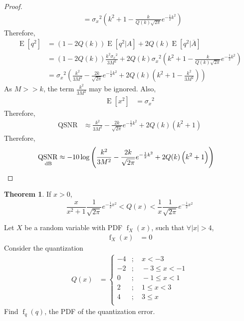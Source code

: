 \documentclass[titlepage, fleqn, a4paper, 12pt, twoside]{article}
\theoremstyle{definition}
\theoremstyle{theorem}
\newtheorem{theorem}{Theorem}
\DeclareMathOperator{\pdf}{\mathrm{f}}
\DeclareMathOperator{\expct}{\mathrm{E}}
\DeclareMathOperator{\QSNR}{\mathrm{QSNR}}
\begin{document}
\begin{proof}
\begin{align*}
		&= {\sigma_x}^2 \left( k^2 + 1 - \frac{k}{Q(k) \sqrt{2 \pi}} e^{-\frac{1}{2} k^2} \right)
	\end{align*}
	Therefore,
	\begin{align*}
		\expct\left[ q^2 \right] &= \left( 1 - 2 Q(k) \right) \expct\left[ q^2 \Big| A \right] + 2 Q(k) \expct\left[ q^2 \Big| \overline{A} \right]\\
		&= \left( 1 - 2 Q(k) \right) \frac{k^2 {\sigma_x}^2}{3 M^2} + 2 Q(k) {\sigma_x}^2 \left( k^2 + 1 - \frac{k}{Q(k) \sqrt{2 \pi}} e^{-\frac{1}{2} k^2} \right)\\
		&= {\sigma_x}^2 \left( \frac{k^2}{3 M^2} - \frac{2 k}{\sqrt{2 \pi}} e^{-\frac{1}{2} k^2} + 2 Q(k) \left( k^2 + 1 - \frac{k^2}{3 M^2} \right) \right)
	\end{align*}
	As $M >> k$, the term $\frac{k^2}{3 M^2}$ may be ignored.
	Also,
	\begin{align*}
		\expct\left[ x^2 \right] &= {\sigma_x}^2
	\end{align*}
	Therefore,
	\begin{align*}
		\QSNR &\approx \frac{k^2}{3 M^2} - \frac{2 k}{\sqrt{2 \pi}} e^{-\frac{1}{2} k^2} + 2 Q(k) \left( k^2 + 1 \right)
	\end{align*}
	Therefore,
	\begin{align*}
		\QSNR_{\decibel} &\approx -10 \log\left( \frac{k^2}{3 M^2} - \frac{2 k}{\sqrt{2 \pi}} e^{-\frac{1}{2} k^2} + 2 Q(k) \left( k^2 + 1 \right) \right)
	\end{align*}
\end{proof}

\begin{theorem}
	If $x > 0$,
	\begin{equation*}
		\frac{x}{x^2 + 1} \frac{1}{\sqrt{2 \pi}} e^{-\frac{1}{2} x^2} < Q(x) < \frac{1}{x} \frac{1}{\sqrt{2 \pi}} e^{-\frac{1}{2} x^2}
	\end{equation*}
\end{theorem}

\begin{question}
	Let $X$ be a random variable with PDF $\pdf_X(x)$, such that $\forall |x| > 4$,
	\begin{align*}
		\pdf_X(x) &= 0
	\end{align*}
	Consider the quantization
	\begin{align*}
		Q(x) &=
			\begin{cases}
				-4 &;\quad x < -3\\
				-2 &;\quad -3 \le x < -1\\
				0 &;\quad -1 \le x < 1\\
				2 &;\quad 1 \le x < 3\\
				4 &;\quad 3 \le x\\
			\end{cases}
	\end{align*}
	Find $\pdf_q(q)$, the PDF of the quantization error.
\end{question}
\end{document}
